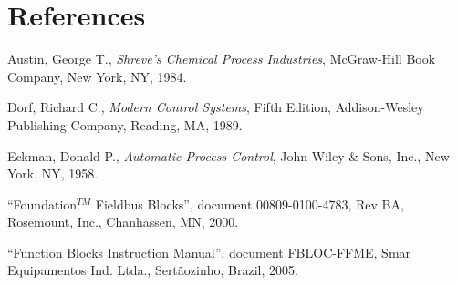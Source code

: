 \begin{itemize}
\end{itemize}













\filbreak
\section*{References}


\noindent
Austin, George T., \textit{Shreve's Chemical Process Industries}, McGraw-Hill Book Company, New York, NY, 1984.

\vskip 10pt

\noindent
Dorf, Richard C., \textit{Modern Control Systems}, Fifth Edition, Addison-Wesley Publishing Company, Reading, MA, 1989.

\vskip 10pt

\noindent
Eckman, Donald P., \textit{Automatic Process Control}, John Wiley \& Sons, Inc., New York, NY, 1958.

\vskip 10pt

\noindent
``Foundation$^{TM}$ Fieldbus Blocks'', document 00809-0100-4783, Rev BA, Rosemount, Inc., Chanhassen, MN, 2000.

\vskip 10pt

\noindent
``Function Blocks Instruction Manual'', document FBLOC-FFME, Smar Equipamentos Ind. Ltda., Sert\~aozinho, Brazil, 2005.

\vskip 10pt

